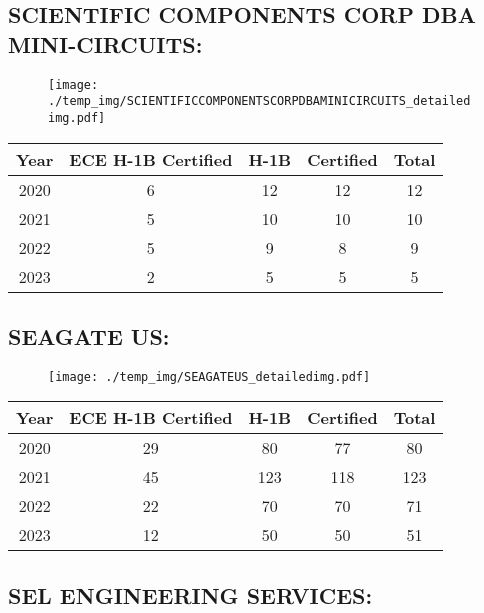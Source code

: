 \documentclass{article}%
\begin{document}
%
\newpage%
\subsection{SCIENTIFIC COMPONENTS CORP DBA MINI{-}CIRCUITS:}%
\label{subsec:SCIENTIFICCOMPONENTSCORPDBAMINI{-}CIRCUITS}%
\label{SCIENTIFICCOMPONENTSCORPDBAMINICIRCUITSdetailed}%


\begin{figure}[htbp]%
\centering%
\texttt{[image: ./temp\_img/SCIENTIFICCOMPONENTSCORPDBAMINICIRCUITS\_detailedimg.pdf]}%
\end{figure}

%
\begin{longtable}{c|c|c|c|c}%
\hline%
Year&ECE H{-}1B Certified&H{-}1B&Certified&Total\\%
\hline%
2020&6&12&12&12\\%
\hline%
2021&5&10&10&10\\%
\hline%
2022&5&9&8&9\\%
\hline%
2023&2&5&5&5\\%
\hline%
\end{longtable}

%
\newpage%
\subsection{SEAGATE US:}%
\label{subsec:SEAGATEUS}%
\label{SEAGATEUSdetailed}%


\begin{figure}[htbp]%
\centering%
\texttt{[image: ./temp\_img/SEAGATEUS\_detailedimg.pdf]}%
\end{figure}

%
\begin{longtable}{c|c|c|c|c}%
\hline%
Year&ECE H{-}1B Certified&H{-}1B&Certified&Total\\%
\hline%
2020&29&80&77&80\\%
\hline%
2021&45&123&118&123\\%
\hline%
2022&22&70&70&71\\%
\hline%
2023&12&50&50&51\\%
\hline%
\end{longtable}

%
\newpage%
\subsection{SEL ENGINEERING SERVICES:}%
\label{subsec:SELENGINEERINGSERVICES}%
\label{SELENGINEERINGSERVICESdetailed}%
\end{document}
